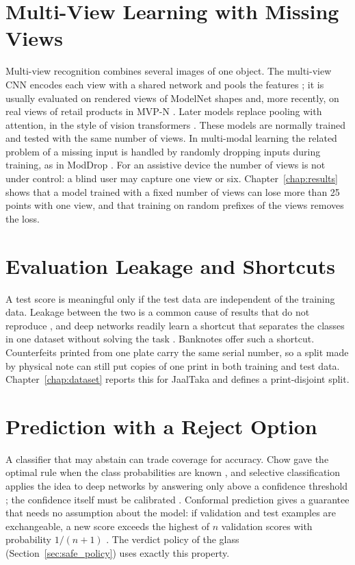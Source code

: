 \section{Multi-View Learning with Missing Views}
\label{sec:multiview_lit}
Multi-view recognition combines several images of one object. The multi-view CNN encodes each view with a shared network and pools the features \cite{mvcnn}; it is usually evaluated on rendered views of ModelNet shapes \cite{modelnet} and, more recently, on real views of retail products in MVP-N \cite{mvpn}. Later models replace pooling with attention, in the style of vision transformers \cite{vit}. These models are normally trained and tested with the same number of views. In multi-modal learning the related problem of a missing input is handled by randomly dropping inputs during training, as in ModDrop \cite{moddrop}. For an assistive device the number of views is not under control: a blind user may capture one view or six. Chapter~\ref{chap:results} shows that a model trained with a fixed number of views can lose more than 25 points with one view, and that training on random prefixes of the views removes the loss.

\section{Evaluation Leakage and Shortcuts}
\label{sec:leakage_lit}
A test score is meaningful only if the test data are independent of the training data. Leakage between the two is a common cause of results that do not reproduce \cite{kapoor2023leakage}, and deep networks readily learn a shortcut that separates the classes in one dataset without solving the task \cite{geirhos2020shortcut}. Banknotes offer such a shortcut. Counterfeits printed from one plate carry the same serial number, so a split made by physical note can still put copies of one print in both training and test data. Chapter~\ref{chap:dataset} reports this for JaalTaka and defines a print-disjoint split.

\section{Prediction with a Reject Option}
\label{sec:safe_lit}
A classifier that may abstain can trade coverage for accuracy. Chow gave the optimal rule when the class probabilities are known \cite{chow1970}, and selective classification applies the idea to deep networks by answering only above a confidence threshold \cite{selective2017}; the confidence itself must be calibrated \cite{guo2017calibration}. Conformal prediction gives a guarantee that needs no assumption about the model: if validation and test examples are exchangeable, a new score exceeds the highest of $n$ validation scores with probability $1/(n+1)$ \cite{vovk2005}. The verdict policy of the glass (Section~\ref{sec:safe_policy}) uses exactly this property.

